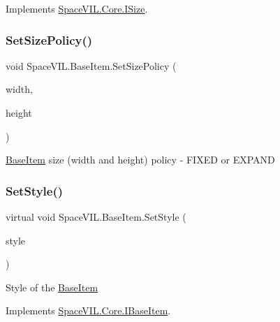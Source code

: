 Implements \mbox{\hyperlink{interface_space_v_i_l_1_1_core_1_1_i_size}{Space\+V\+I\+L.\+Core.\+I\+Size}}.

\mbox{\label{class_space_v_i_l_1_1_base_item_ae07c14607caf666e80c40f9f0df2882a}} 
\subsubsection{\texorpdfstring{Set\+Size\+Policy()}{SetSizePolicy()}}
{\footnotesize\ttfamily void Space\+V\+I\+L.\+Base\+Item.\+Set\+Size\+Policy (\begin{DoxyParamCaption}\item[{Size\+Policy}]{width,  }\item[{Size\+Policy}]{height }\end{DoxyParamCaption})}



\mbox{\hyperlink{class_space_v_i_l_1_1_base_item}{Base\+Item}} size (width and height) policy -\/ F\+I\+X\+ED or E\+X\+P\+A\+ND 

\mbox{\label{class_space_v_i_l_1_1_base_item_a74dec9854f0a7553ad3b50f140bfe07d}} 
\subsubsection{\texorpdfstring{Set\+Style()}{SetStyle()}}
{\footnotesize\ttfamily virtual void Space\+V\+I\+L.\+Base\+Item.\+Set\+Style (\begin{DoxyParamCaption}\item[{\mbox{\hyperlink{class_space_v_i_l_1_1_decorations_1_1_style}{Style}}}]{style }\end{DoxyParamCaption})\hspace{0.3cm}{\ttfamily [virtual]}}



Style of the \mbox{\hyperlink{class_space_v_i_l_1_1_base_item}{Base\+Item}} 



Implements \mbox{\hyperlink{interface_space_v_i_l_1_1_core_1_1_i_base_item}{Space\+V\+I\+L.\+Core.\+I\+Base\+Item}}.



